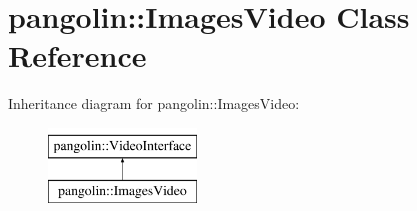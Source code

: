 \hypertarget{classpangolin_1_1_images_video}{}\section{pangolin\+:\+:Images\+Video Class Reference}
\label{classpangolin_1_1_images_video}
Inheritance diagram for pangolin\+:\+:Images\+Video\+:\begin{figure}[H]
\begin{center}
\leavevmode
\includegraphics[height=2.000000cm]{classpangolin_1_1_images_video}
\end{center}
\end{figure}
